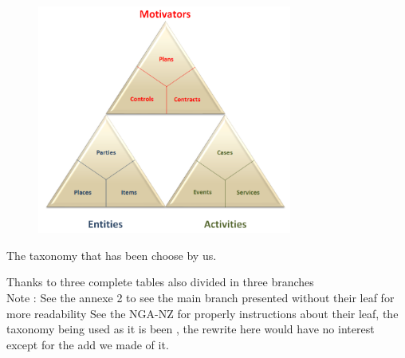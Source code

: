 \documentclass[12pt]{report}
\begin{document}

\begin{figure}[H]
	\begin{Center}
		\includegraphics[width=3.29in,height=2.96in]{./media/image12.png}
	\end{Center}
\end{figure}



\par

The taxonomy that has been choose by us.\par

Thanks to three complete tables also divided in three branches \\
Note : 	See the annexe 2 to see the main branch presented without their leaf for more readability
See the NGA-NZ for properly instructions about their leaf, the taxonomy being used as it is been , the rewrite here would have no interest except for the add we made of it.\par
\end{document}
